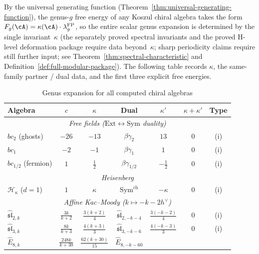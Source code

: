 By the universal generating function
(Theorem~\ref{thm:universal-generating-function}), the genus-$g$
free energy of any Koszul chiral algebra takes the form
$F_g(\cA) = \kappa(\cA) \cdot \lambda_g^{\mathrm{FP}}$, so the
entire scalar genus expansion is determined by the single
invariant~$\kappa$ (the separately proved spectral invariants and the
proved H-level deformation package require data beyond~$\kappa$; sharp
periodicity claims require still further input; see
Theorem~\ref{thm:spectral-characteristic} and
Definition~\ref{def:full-modular-package}).
The following table records $\kappa$, the same-family partner / dual data, and
the first three explicit free energies.

\begin{table}[ht]
\centering
\caption{Genus expansion for all computed chiral algebras}
\label{tab:genus-expansion-master}
\renewcommand{\arraystretch}{1.5}
{\small
\begin{tabular}{|l|c|c|c|c|c|c|}
\hline
\textbf{Algebra} & $c$ & $\kappa$ &
\textbf{Dual} & $\kappa'$ & $\kappa{+}\kappa'$ &
\textbf{Type} \\
\hline
\multicolumn{7}{|c|}{\textit{Free fields
  ($\mathrm{Ext} \leftrightarrow \mathrm{Sym}$ duality)}} \\
\hline
$bc_2$ (ghosts)
  & $-26$ & $-13$ & $\beta\gamma_2$
  & $13$ & $0$ & (i) \\
\hline
$bc_1$
  & $-2$ & $-1$ & $\beta\gamma_1$
  & $1$ & $0$ & (i) \\
\hline
$bc_{1/2}$ (fermion)
  & $1$ & $\frac{1}{2}$ & $\beta\gamma_{1/2}$
  & $-\frac{1}{2}$ & $0$ & (i) \\
\hline
\multicolumn{7}{|c|}{\textit{Heisenberg}} \\
\hline
$\mathcal{H}_\kappa$ ($d = 1$)
  & $1$ & $\kappa$ & $\mathrm{Sym}^{\mathrm{ch}}$
  & $-\kappa$ & $0$ & (i) \\
\hline
\multicolumn{7}{|c|}{\textit{Affine Kac--Moody
  ($k \mapsto -k - 2h^\vee$)}} \\
\hline
$\widehat{\mathfrak{sl}}_{2,k}$
  & $\frac{3k}{k{+}2}$ & $\frac{3(k{+}2)}{4}$
  & $\widehat{\mathfrak{sl}}_{2,-k-4}$
  & $\frac{3(-k{-}2)}{4}$ & $0$ & (i) \\
\hline
$\widehat{\mathfrak{sl}}_{3,k}$
  & $\frac{8k}{k{+}3}$ & $\frac{4(k{+}3)}{3}$
  & $\widehat{\mathfrak{sl}}_{3,-k-6}$
  & $\frac{4(-k{-}3)}{3}$ & $0$ & (i) \\
\hline
$\widehat{E}_{8,k}$
  & $\frac{248k}{k{+}30}$ & $\frac{62(k{+}30)}{15}$
  & $\widehat{E}_{8,-k-60}$

\end{tabular}}
\end{table}
